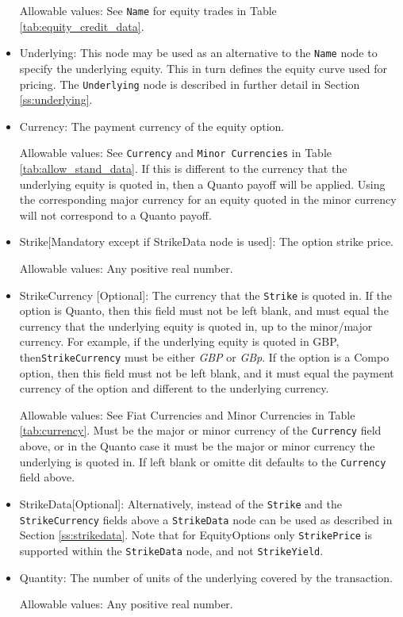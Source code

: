 \begin{itemize}
	Allowable values: See \lstinline!Name! for equity trades in Table \ref{tab:equity_credit_data}.
	
	\item Underlying: This node may be used as an alternative to the \lstinline!Name! node to
	specify the underlying equity. This in turn defines the equity curve used for pricing. The
	\lstinline!Underlying! node is described in further detail in Section \ref{ss:underlying}. \\
	
	\item Currency: The payment currency of the equity option. 
	
	Allowable values: See \lstinline!Currency! and \lstinline!Minor Currencies! in Table
	\ref{tab:allow_stand_data}.	If this is different to the currency that the underlying equity
	is quoted in, then a Quanto payoff will be applied. Using the corresponding major currency
	for an equity quoted in the minor currency will not correspond to a Quanto payoff.
	
	\item Strike[Mandatory except if StrikeData node is used]: The option strike price.
	
	Allowable values: Any positive real number.	
	
	\item StrikeCurrency [Optional]: The currency that the \lstinline!Strike! is quoted in. If
	the option is Quanto, then this field must not be left blank, and must equal the currency
	that the underlying equity is quoted in, up to the minor/major currency. For example, if 
	the underlying equity is quoted in GBP, then\lstinline!StrikeCurrency! must be either
	\emph{GBP} or \emph{GBp}. If the option is a Compo option, then this field must not be 
	left blank, and it must equal the payment currency of the option and different to the 
	underlying currency.
	
	Allowable values: See Fiat Currencies and Minor Currencies in Table
	\ref{tab:currency}.	Must be the major or minor currency of the \lstinline!Currency!
	field above, or in the Quanto case it must be the major or minor currency the underlying is quoted in. If left blank or omitte dit defaults to the \lstinline!Currency!
	field above.

	
	\item StrikeData[Optional]: Alternatively, instead of the \lstinline!Strike! and the \lstinline!StrikeCurrency! fields above a \lstinline!StrikeData! node can be used as described in Section \ref{ss:strikedata}. Note that for EquityOptions only \lstinline!StrikePrice!  is supported within the \lstinline!StrikeData! node, and not \lstinline!StrikeYield!. 
	
	\item Quantity: The number of units of the underlying covered by the transaction. 
	
	Allowable values: Any positive real number.
\end{itemize}
